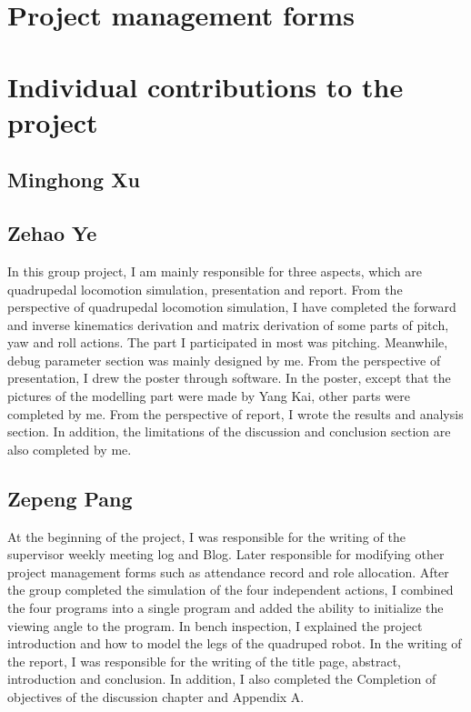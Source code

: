 \newpage
\appendix
\appendixpage
\addappheadtotoc

\chapter{Project management forms}








\chapter{Individual contributions to the project}
\section{Minghong Xu}
\section{Zehao Ye}
In this group project, I am mainly responsible for three aspects, which are quadrupedal locomotion simulation, presentation and report. From the perspective of quadrupedal locomotion simulation, I have completed the forward and inverse kinematics derivation and matrix derivation of some parts of pitch, yaw and roll actions. The part I participated in most was pitching. Meanwhile, debug parameter section was mainly designed by me. From the perspective of presentation, I drew the poster through software. In the poster, except that the pictures of the modelling part were made by Yang Kai, other parts were completed by me. From the perspective of report, I wrote the results and analysis section. In addition, the limitations of the discussion and conclusion section are also completed by me.

\section{Zepeng Pang}

At the beginning of the project, I was responsible for the writing of the supervisor weekly meeting log and Blog. Later responsible for modifying other project management forms such as attendance record and role allocation. After the group completed the simulation of the four independent actions, I combined the four programs into a single program and added the ability to initialize the viewing angle to the program. In bench inspection, I explained the project introduction and how to model the legs of the quadruped robot. In the writing of the report, I was responsible for the writing of the title page, abstract, introduction and conclusion. In addition, I also completed the Completion of objectives of the discussion chapter and Appendix A.

